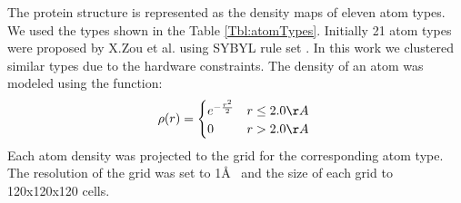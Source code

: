 The protein structure is represented as the density maps of eleven atom types. 
We used the types shown in the Table \ref{Tbl:atomTypes}. Initially 21 atom types were proposed by X.Zou et al. 
\cite{huang2006iterative, huang2008iterative} using SYBYL rule set \cite{wang2006automatic}. In this work we clustered similar
types due to the hardware constraints. The density of an atom was modeled using the function: 
$$
\rho(r) =  \begin{cases}
               e^{-\frac{r^2}{2}}&r\leq 2.0\AA~\\
               0                 &r>2.0\AA~\\
            \end{cases}
$$
Each atom density was projected to the grid for the corresponding atom type. The resolution of the grid was set to 1\AA~ and the size of 
each grid to 120x120x120 cells.

